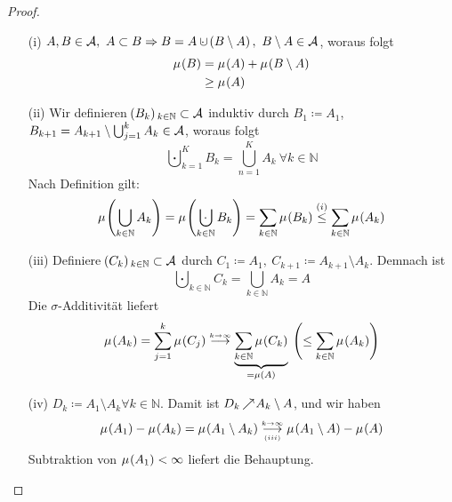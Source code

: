 \documentclass[skript.tex]{\mf{P}s}
\begin{document}
	
	\begin{proof}
		\hfill
		\begin{itemize}
			\item[(i)] $A,B \in \mc{A},\ A\subset B \Rightarrow B = A\cupdot\ \pr{B\setminus A},\ B\setminus A \in \mc{A}$, woraus folgt
				\begin{align*}
					\mu\pr{B} &= \mu\pr{A} + \mu\pr{B\setminus A}\\
					&\ge \mu\pr{A}
				\end{align*}
			
			\item[(ii)] Wir definieren $\pr{B_k}_{k\in \mathbb{N}} \subset \mc{A}$ induktiv durch $B_1 \coloneqq A_1$, $B_{k+1} = A_{k+1}\setminus \bigcup_{j=1}^k A_k \in \mathcal{A}$, woraus folgt
				\begin{equation*}
					\bigcupdot_{k=1}^K B_k = \bigcup_{n=1}^K A_k\ \forall k \in \mathbb{N}
				\end{equation*}
			Nach Definition gilt:
				\begin{equation*}
					\mu\pr{\bigcup_{k \in \mathbb{N}}A_k} = \mu\pr{\bigcupdot_{k\in \mathbb{N}} B_k} = \sum_{k\in \mathbb{N}} \mu\pr{B_k} \stackrel{(i)}{\le} \sum_{k\in\mathbb{N}}\mu\pr{A_k}
				\end{equation*}
			
			\item[(iii)] Definiere $\pr{C_k}_{k \in \mathbb{N}} \subset \mc{A}$ durch $C_1 \coloneqq A_1,\ C_{k+1} \coloneqq A_{k+1}\setminus A_k$. Demnach ist 
				\begin{equation*}
					\bigcupdot_{k\in\mathbb{N}} C_k = \bigcup_{k \in\mathbb{N}} A_k = A
				\end{equation*}
			Die $\sigma$-Additivität liefert
				\begin{equation*}
					\mu\pr{A_k} = \sum_{j=1}^k \mu\pr{C_j} \stackrel{\scriptscriptstyle k\rightarrow\infty}{\longrightarrow} 
					\underbrace{\sum_{k\in\mathbb{N}} \mu\pr{C_k}}_{=\mu\pr{A}}\ \pr{\le \sum_{k\in\mathbb{N}} \mu\pr{A_k}}
				\end{equation*}
				
			\item[(iv)] $D_k \coloneqq A_1\setminus A_k \forall k \in \mathbb{N}$. Damit ist $D_k \kern -1pt \nearrow \kern -2pt A_k\setminus A$, und wir haben 
				\begin{equation*}
					\mu\pr{A_1} - \mu\pr{A_k} = \mu\pr{A_1\setminus A_k} \underset{\scriptscriptstyle (iii)}{\stackrel{\scriptscriptstyle k\rightarrow\infty}{\longrightarrow}} \mu\pr{A_1\setminus A} - \mu\pr{A}
				\end{equation*}
			Subtraktion von $\mu\pr{A_1} < \infty$ liefert die Behauptung.
		\end{itemize}
	\end{proof}
\end{document}
